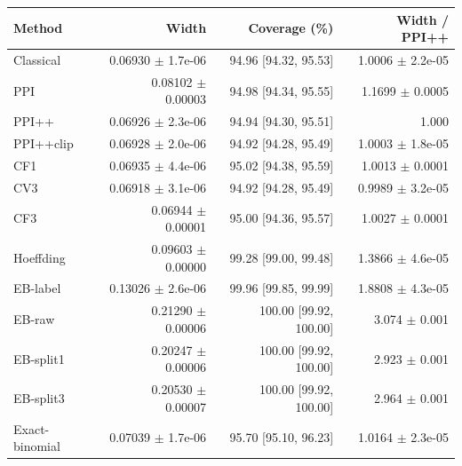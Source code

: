 \small
\begin{tabular}{lrrr}
\toprule
Method & Width & Coverage (\%) & Width / PPI++ \\
\midrule
Classical & 0.06930 $\pm$ 1.7e-06 & 94.96 [94.32, 95.53] & 1.0006 $\pm$ 2.2e-05 \\
PPI & 0.08102 $\pm$ 0.00003 & 94.98 [94.34, 95.55] & 1.1699 $\pm$ 0.0005 \\
PPI++ & 0.06926 $\pm$ 2.3e-06 & 94.94 [94.30, 95.51] & 1.000 \\
PPI++clip & 0.06928 $\pm$ 2.0e-06 & 94.92 [94.28, 95.49] & 1.0003 $\pm$ 1.8e-05 \\
CF1 & 0.06935 $\pm$ 4.4e-06 & 95.02 [94.38, 95.59] & 1.0013 $\pm$ 0.0001 \\
CV3 & 0.06918 $\pm$ 3.1e-06 & 94.92 [94.28, 95.49] & 0.9989 $\pm$ 3.2e-05 \\
CF3 & 0.06944 $\pm$ 0.00001 & 95.00 [94.36, 95.57] & 1.0027 $\pm$ 0.0001 \\
Hoeffding & 0.09603 $\pm$ 0.00000 & 99.28 [99.00, 99.48] & 1.3866 $\pm$ 4.6e-05 \\
EB-label & 0.13026 $\pm$ 2.6e-06 & 99.96 [99.85, 99.99] & 1.8808 $\pm$ 4.3e-05 \\
EB-raw & 0.21290 $\pm$ 0.00006 & 100.00 [99.92, 100.00] & 3.074 $\pm$ 0.001 \\
EB-split1 & 0.20247 $\pm$ 0.00006 & 100.00 [99.92, 100.00] & 2.923 $\pm$ 0.001 \\
EB-split3 & 0.20530 $\pm$ 0.00007 & 100.00 [99.92, 100.00] & 2.964 $\pm$ 0.001 \\
Exact-binomial & 0.07039 $\pm$ 1.7e-06 & 95.70 [95.10, 96.23] & 1.0164 $\pm$ 2.3e-05 \\
\bottomrule
\end{tabular}
